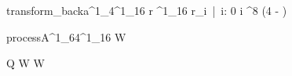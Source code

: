 \documentclass[12pt,a4paper]{book}
\begin{document}
\begin{eqcode}{transform\_back}{a}{^1_4}{^1_{16}}
    r \in {}^1_{16} \lend
    r_i\  |\  i: 0 \leq i  \gets {} ^{8 \cdot (4 - )} \lend
     \lend
\end{eqcode}
%
\begin{eqcode}{process}{A}{^1_{64}}{^1_{16}}
    W \gets \begin{tmatrix}
         \lend
         \lend
         \lend
         \lend
    \end{tmatrix} \lend
    Q \gets {} \lend
    W \gets {} \lend \quad W \gets {} \lend


\end{eqcode}
\end{document}
